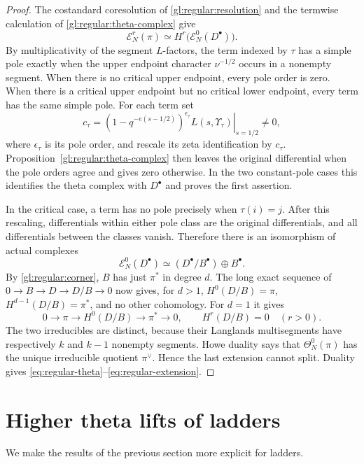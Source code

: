 \documentclass[10pt,a4paper]{article}
\theoremstyle{definition}
\theoremstyle{remark}
\numberwithin{equation}{section}
\newcommand{\cE}{\mathcal{E}}
\begin{document}
\begin{proof}
The costandard coresolution of \cref{gl:regular:resolution} and
the termwise calculation of \cref{gl:regular:theta-complex} give
\[
 \cE_N^r(\pi)
  \simeq H^r\bigl(\cE_N^0(D^\bullet)\bigr).
\]
By multiplicativity of the segment $L$-factors, the term indexed by $\tau$ has a
simple pole exactly when the upper endpoint character $\nu^{-1/2}$ occurs in a
nonempty segment. When there is no critical upper endpoint, every pole order
is zero. When there is a critical upper endpoint but no critical lower endpoint, every
term has the same simple pole. For each term set
\[
 c_\tau=\left.(1-q^{-e(s-1/2)})^{\epsilon_\tau}
                 L(s,\Upsilon_\tau)\right|_{s=1/2}\ne0,
\]
where $\epsilon_\tau$ is its pole order, and rescale its zeta
identification by $c_\tau$.
Proposition~\ref{gl:regular:theta-complex} then leaves the
original differential when the pole orders agree and gives zero
otherwise. In the two constant-pole cases this identifies the
theta complex with $D^\bullet$ and proves the first assertion.

In the critical case, a term has no pole precisely when $\tau(i)=j$.
After this rescaling, differentials within either pole class
are the original differentials, and all differentials between the
classes vanish. Therefore there is an isomorphism of actual complexes
\[
 \cE_N^0(D^\bullet)\simeq (D^\bullet/B^\bullet)\oplus B^\bullet.
\]
By \cref{gl:regular:corner}, $B$ has just $\pi^*$ in degree $d$.
The long exact sequence of $0\to B\to D\to D/B\to0$ now gives,
for $d>1$, $H^0(D/B)=\pi$, $H^{d-1}(D/B)=\pi^*$, and no other
cohomology. For $d=1$ it gives
\[
 0\longrightarrow\pi\longrightarrow H^0(D/B)
    \longrightarrow\pi^*\longrightarrow0,
 \qquad H^r(D/B)=0\quad(r>0).
\]
The two irreducibles are distinct, because their Langlands
multisegments have respectively $k$ and $k-1$ nonempty segments.
Howe duality \cite[Theorem~1 and Corollary~6.3]{Minguez2008} says
that $\Theta_N^0(\pi)$ has the unique irreducible quotient
$\pi^\vee$. Hence the last extension cannot split. Duality
gives \eqref{eq:regular-theta}--\eqref{eq:regular-extension}.
\end{proof}


\section{Higher theta lifts of ladders}

We make the results of the previous section more explicit for ladders. 
\end{document}
